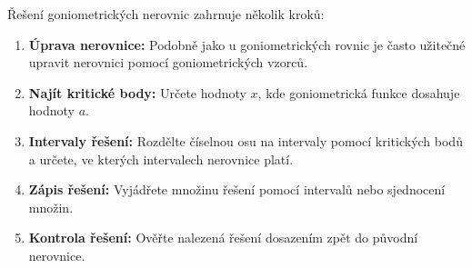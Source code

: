 \documentclass[12pt,a4paper]{article}
\begin{document}
Řešení goniometrických nerovnic zahrnuje několik kroků:
\begin{enumerate}[label=\arabic*.]
    \item \textbf{Úprava nerovnice:} Podobně jako u goniometrických rovnic je často užitečné upravit nerovnici pomocí goniometrických vzorců.
    \item \textbf{Najít kritické body:} Určete hodnoty $x$, kde goniometrická funkce dosahuje hodnoty $a$.
    \item \textbf{Intervaly řešení:} Rozdělte číselnou osu na intervaly pomocí kritických bodů a určete, ve kterých intervalech nerovnice platí.
    \item \textbf{Zápis řešení:} Vyjádřete množinu řešení pomocí intervalů nebo sjednocení množin.
    \item \textbf{Kontrola řešení:} Ověřte nalezená řešení dosazením zpět do původní nerovnice.
\end{enumerate}
\end{document}
